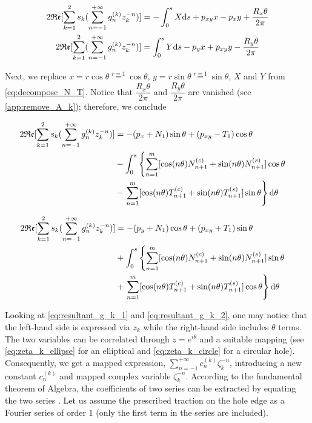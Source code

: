 \documentclass{article}
\begin{document}
\begin{gather*}
    2 \mathfrak{Re}[\sum_{k=1}^{2} s_k (\displaystyle\sum_{n=-1}^{+\infty} g_n^{(k)} z_k^{-n}) ] = -\int_{0}^{s}{X \mathrm{d}s} + p_{xy} x - p_x y + \dfrac{R_x \theta}{2\pi} \notag \\
    2 \mathfrak{Re}[\sum_{k=1}^{2} (\displaystyle\sum_{n=-1}^{+\infty} g_n^{(k)} z_k^{-n}) ] = \int_{0}^{s}{Y \mathrm{d}s} - p_y x + p_{xy} y - \dfrac{R_y \theta}{2\pi}
\end{gather*}

Next, we replace $x=r\cos\theta \overset{r=1}{=} \cos\theta$, $y=r\sin\theta \overset{r=1}{=} \sin\theta$, $X$ and $Y$ from \cref{eq:decompose_N_T}. Notice that $\dfrac{R_x \theta}{2\pi}$ and $\dfrac{R_y \theta}{2\pi}$ are vanished (see \cref{app:remove_A_k}); therefore, we conclude 

\begin{align}
    2 \mathfrak{Re}[\sum_{k=1}^{2} s_k (\displaystyle\sum_{n=-1}^{+\infty} g_n^{(k)} z_k^{-n}) ] & = -(p_x + N_1) \sin\theta + (p_{xy} - T_1) \cos\theta & \notag\\
    &- \int_{0}^{s}{ \left\{ \sum_{n=1}^{m}[\cos(n\theta) N_{n+1}^{(c)} + \sin(n\theta) N_{n+1}^{(s)}] \cos\theta \right.} & \notag\\
    & - \left. \sum_{n=1}^{m}[\cos(n\theta) T_{n+1}^{(c)} + \sin(n\theta) T_{n+1}^{(s)}] \sin\theta \right\} \mathrm{d} \theta &
    \label{eq:resultant_g_k_1}
\end{align}

\begin{align}
    2 \mathfrak{Re}[\sum_{k=1}^{2} s_k (\displaystyle\sum_{n=-1}^{+\infty} g_n^{(k)} z_k^{-n}) ] & = -(p_y + N_1) \cos\theta + (p_{xy} + T_1) \sin\theta & \notag\\
    & + \int_{0}^{s}{ \left\{ \sum_{n=1}^{m}[\cos(n\theta) N_{n+1}^{(c)} + \sin(n\theta) N_{n+1}^{(s)}] \sin\theta \right.} & \notag\\
    & + \left. \sum_{n=1}^{m}[\cos(n\theta) T_{n+1}^{(c)} + \sin(n\theta) T_{n+1}^{(s)}] \cos\theta \right\} \mathrm{d} \theta &
    \label{eq:resultant_g_k_2}
\end{align}

Looking at \cref{eq:resultant_g_k_1} and \cref{eq:resultant_g_k_2}, one may notice that the left-hand side is expressed via $z_k$ while the right-hand side includes $\theta$ terms. The two variables can be correlated through $z=e^{i\theta}$ and a suitable mapping (see \cref{eq:zeta_k_ellipse} for an elliptical and \cref{eq:zeta_k_circle} for a circular hole). Consequently, we get a mapped expression, $\displaystyle\sum_{n=-1}^{+\infty} c_n^{(k)} \zeta_k^{-n}$, introducing a new constant $c_n^{(k)}$ and mapped complex variable $\zeta_k^{-n}$. According to the fundamental theorem of Algebra, the coefficients of two series can be extracted by equating the two series \cite{Young2017}. Let us assume \cite{Koussios2015} the prescribed traction on the hole edge as a Fourier series of order 1 (only the first term in the series are included).
\end{document}
